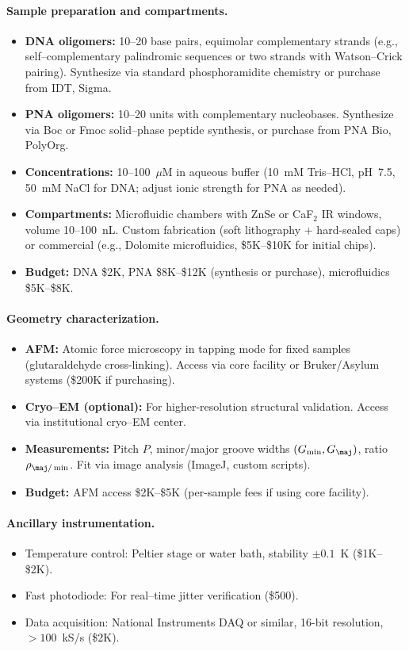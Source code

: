 \documentclass[11pt]{article}
\begin{document}
\paragraph{Sample preparation and compartments.}
\begin{itemize}
\item \textbf{DNA oligomers:} 10–20 base pairs, equimolar complementary strands (e.g., self–complementary palindromic sequences or two strands with Watson–Crick pairing). Synthesize via standard phosphoramidite chemistry or purchase from IDT, Sigma.
\item \textbf{PNA oligomers:} 10–20 units with complementary nucleobases. Synthesize via Boc or Fmoc solid–phase peptide synthesis, or purchase from PNA Bio, PolyOrg.
\item \textbf{Concentrations:} 10–100~$\mu$M in aqueous buffer (10~mM Tris–HCl, pH~7.5, 50~mM NaCl for DNA; adjust ionic strength for PNA as needed).
\item \textbf{Compartments:} Microfluidic chambers with ZnSe or CaF$_2$ IR windows, volume 10–100~nL. Custom fabrication (soft lithography + hard-sealed caps) or commercial (e.g., Dolomite microfluidics, \$5K–\$10K for initial chips).
\item \textbf{Budget:} DNA \$2K, PNA \$8K–\$12K (synthesis or purchase), microfluidics \$5K–\$8K.
\end{itemize}

\paragraph{Geometry characterization.}
\begin{itemize}
\item \textbf{AFM:} Atomic force microscopy in tapping mode for fixed samples (glutaraldehyde cross-linking). Access via core facility or Bruker/Asylum systems (\$200K if purchasing).
\item \textbf{Cryo–EM (optional):} For higher-resolution structural validation. Access via institutional cryo–EM center.
\item \textbf{Measurements:} Pitch $P$, minor/major groove widths $(G_{\min},G_{\maj})$, ratio $\rho_{\maj/\min}$. Fit via image analysis (ImageJ, custom scripts).
\item \textbf{Budget:} AFM access \$2K–\$5K (per-sample fees if using core facility).
\end{itemize}

\paragraph{Ancillary instrumentation.}
\begin{itemize}
\item Temperature control: Peltier stage or water bath, stability $\pm 0.1$~K (\$1K–\$2K).
\item Fast photodiode: For real–time jitter verification (\$500).
\item Data acquisition: National Instruments DAQ or similar, 16-bit resolution, $>100$~kS/s (\$2K).
\end{itemize}
\end{document}
